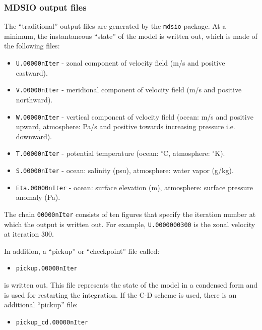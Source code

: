 \subsubsection{MDSIO output files}

The ``traditional'' output files are generated by the \texttt{mdsio}
package.  At a minimum, the instantaneous ``state'' of the model is
written out, which is made of the following files:

\begin{itemize}
\item \texttt{U.00000nIter} - zonal component of velocity field (m/s
  and positive eastward).

\item \texttt{V.00000nIter} - meridional component of velocity field
  (m/s and positive northward).

\item \texttt{W.00000nIter} - vertical component of velocity field
  (ocean: m/s and positive upward, atmosphere: Pa/s and positive
  towards increasing pressure i.e. downward).

\item \texttt{T.00000nIter} - potential temperature (ocean:
  $^{\circ}\mathrm{C}$, atmosphere: $^{\circ}\mathrm{K}$).

\item \texttt{S.00000nIter} - ocean: salinity (psu), atmosphere: water
  vapor (g/kg).

\item \texttt{Eta.00000nIter} - ocean: surface elevation (m),
  atmosphere: surface pressure anomaly (Pa).
\end{itemize}

The chain \texttt{00000nIter} consists of ten figures that specify the
iteration number at which the output is written out. For example,
\texttt{U.0000000300} is the zonal velocity at iteration 300.

In addition, a ``pickup'' or ``checkpoint'' file called:

\begin{itemize}
\item \texttt{pickup.00000nIter}
\end{itemize}

is written out. This file represents the state of the model in a condensed
form and is used for restarting the integration. If the C-D scheme is used,
there is an additional ``pickup'' file:

\begin{itemize}
\item \texttt{pickup\_cd.00000nIter}
\end{itemize}

